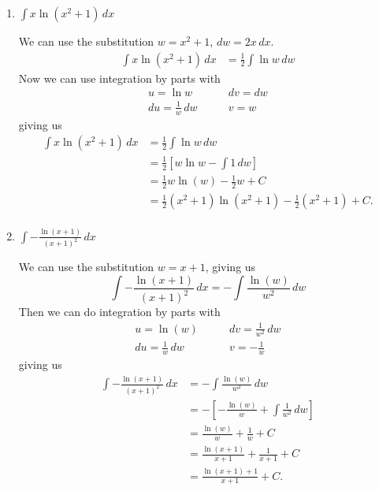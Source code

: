 \documentclass{article}
\begin{document}
\begin{enumerate}
\begin{enumerate}

\item
\begin{problem}[\vfill]
    $\displaystyle \int x \ln(x^2+1) \, dx$
\end{problem}

\begin{solution}
    We can use the substitution $w=x^2+1$, $dw = 2x\, dx$.
    \begin{align*}
        \int x \ln(x^2+1)\, dx &= \frac{1}{2}\int \ln w \, dw  
    \end{align*}
    Now we can use integration by parts with
    \begin{align*}
        u = \ln w \qquad & dv = dw \\
        du = \frac{1}{w}\, dw \qquad & v = w
    \end{align*}
    giving us
    \begin{align*}
        \int x \ln(x^2+1)\, dx &= \frac{1}{2}\int \ln w \, dw  \\
        &= \frac{1}{2}\left[w\ln w - \int 1 \, dw \right] \\
        &= \frac{1}{2}w\ln(w) - \frac{1}{2}w + C\\
        &= \frac{1}{2}(x^2+1)\ln(x^2+1) -\frac{1}{2}(x^2+1) +C. \\
    \end{align*}
\end{solution}

\item 
\begin{problem}[\vfill\newpage]
    $\displaystyle \int -\frac{\ln(x+1)}{(x+1)^2} \, dx$
\end{problem}

\begin{solution}
    We can use the substitution $w = x+1$, giving us
    \[\int -\frac{\ln(x+1)}{(x+1)^2} \, dx = -\int \frac{\ln(w)}{w^2} \, dw \]
    Then we can do integration by parts with
    \begin{align*}
        u = \ln(w) \qquad & dv = \frac{1}{w^2}\, dw \\
        du = \frac{1}{w}\,dw \qquad & v = -\frac{1}{w}
    \end{align*}
    giving us
    \begin{align*}
    \int -\frac{\ln(x+1)}{(x+1)^2} \, dx &= -\int \frac{\ln(w)}{w^2} \, dw\\
     &=  -\left[-\frac{\ln(w)}{w} + \int \frac{1}{w^2}\,dw \right] \\
     &= \frac{\ln(w)}{w} + \frac{1}{w} + C \\
     &= \frac{\ln(x+1)}{x+1} + \frac{1}{x+1} + C \\
     &= \frac{\ln(x+1)+1}{x+1} + C.
    \end{align*}
\end{solution}


\end{enumerate}
\end{enumerate}
\end{document}
